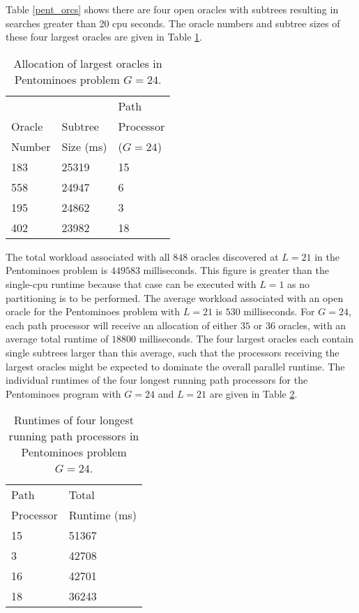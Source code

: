 Table \ref{pent_orcs} shows there are four open oracles with subtrees resulting in searches
greater than 20 cpu seconds.   The oracle numbers and subtree sizes of these four largest
oracles are given in Table \ref{pent_top_four}.

\begin{table}[htb]
{\small
\begin{tabular}{| l | l | l |}
\hline
       &           & Path      \\
Oracle & Subtree   & Processor \\
Number & Size (ms) & ($G=24$)  \\
\hline
183    & 25319     & 15 \\
558    & 24947     & 6  \\
195    & 24862     & 3  \\
402    & 23982     & 18 \\
\hline
\end{tabular}
}
\caption[Large oracle allocation in Pentominoes]{Allocation of largest oracles
                                                 in Pentominoes problem $G=24$.}
\label{pent_top_four}
\end{table}

The total workload associated with all $848$ oracles discovered at
$L=21$ in the Pentominoes problem is $449583$ milliseconds.  This
figure is greater than the single-cpu runtime because that case can be
executed with $L=1$ as no partitioning is to be performed.  The
average workload associated with an open oracle for the Pentominoes
problem with $L=21$ is $530$ milliseconds.  For $G=24$, each path
processor will receive an allocation of either $35$ or $36$ oracles,
with an average total runtime of $18800$ milliseconds.  The four
largest oracles each contain single subtrees larger than this
average, such that the processors receiving the largest oracles might
be expected to dominate the overall parallel runtime.  The individual
runtimes of the four longest running path processors for the
Pentominoes program with $G=24$ and $L=21$ are given in Table
\ref{pent_long_runs}.

\begin{table}[htb]
{\small
\begin{tabular}{| l | l |}
\hline
Path      & Total        \\
Processor & Runtime (ms) \\
\hline
15    & 51367   \\
3     & 42708   \\
16    & 42701   \\
18    & 36243   \\
\hline
\end{tabular}
}
\caption{Runtimes of four longest running path processors in Pentominoes problem $G=24$.}
\label{pent_long_runs}
\end{table}


